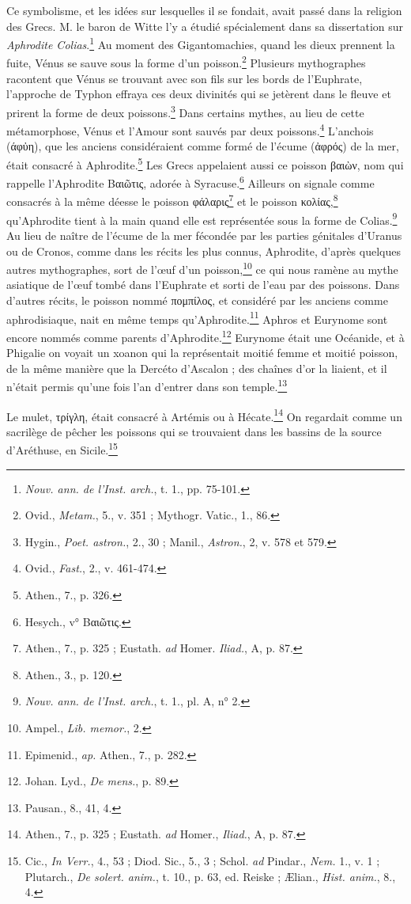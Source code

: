 \documentclass[a4paper, 11pt, oneside, landscape]{article}
\begin{document}
Ce symbolisme, et les idées sur lesquelles il se fondait, avait passé dans la religion des Grecs. M. le baron de Witte l'y a étudié spécialement dans sa dissertation sur \emph{Aphrodite Colias}.\footnote{\emph{Nouv. ann. de l'Inst. arch.}, t. 1., pp. 75-101.} Au moment des Gigantomachies, quand les dieux prennent la fuite, Vénus se sauve sous la forme d'un poisson.\footnote{Ovid., \emph{Metam.}, 5., v. 351 ; Mythogr. Vatic., 1., 86.} Plusieurs mythographes racontent que Vénus se trouvant avec son fils sur les bords de l'Euphrate, l'approche de Typhon effraya ces deux divinités qui se jetèrent dans le fleuve et prirent la forme de deux poissons.\footnote{Hygin., \emph{Poet. astron.}, 2., 30 ; Manil., \emph{Astron.}, 2, v. 578 et 579.} Dans certains mythes, au lieu de cette métamorphose, Vénus et l'Amour sont sauvés par deux poissons.\footnote{Ovid., \emph{Fast.}, 2., v. 461-474.} L'anchois (άφὐη), que les anciens considéraient comme formé de l'écume (ἀφρός) de la mer, était consacré à Aphrodite.\footnote{Athen., 7., p. 326.} Les Grecs appelaient aussi ce poisson βαιὼν, nom qui rappelle l'Aphrodite Βαιῶτις, adorée à Syracuse.\footnote{Hesych., v° Βαιῶτις.} Ailleurs on signale comme consacrés à la même déesse le poisson φάλαρις\footnote{Athen., 7., p. 325 ; Eustath. \emph{ad} Homer. \emph{Iliad.}, A, p. 87.} et le poisson κολίας,\footnote{Athen., 3., p. 120.} qu'Aphrodite tient à la main quand elle est représentée sous la forme de Colias.\footnote{\emph{Nouv. ann. de l'Inst. arch.}, t. 1., pl. A, n° 2.} Au lieu de naître de l'écume de la mer fécondée par les parties génitales d'Uranus ou de Cronos, comme dans les récits les plus connus, Aphrodite, d'après quelques autres mythographes, sort de l'œuf d'un poisson,\footnote{Ampel., \emph{Lib. memor.}, 2.} ce qui nous ramène au mythe asiatique de l'œuf tombé dans l'Euphrate et sorti de l'eau par des poissons. Dans d'autres récits, le poisson nommé πομπίλος, et considéré par les anciens comme aphrodisiaque, nait en même temps qu'Aphrodite.\footnote{Epimenid., \emph{ap.} Athen., 7., p. 282.} Aphros et Eurynome sont encore nommés comme parents d'Aphrodite.\footnote{Johan. Lyd., \emph{De mens.}, p. 89.} Eurynome était une Océanide, et à Phigalie on voyait un xoanon qui la représentait moitié femme et moitié poisson, de la même manière que la Dercéto d'Ascalon ; des chaînes d'or la liaient, et il n'était permis qu'une fois l'an d'entrer dans son temple.\footnote{Pausan., 8., 41, 4.}

Le mulet, τρίγλη, était consacré à Artémis ou à Hécate.\footnote{Athen., 7., p. 325 ; Eustath. \emph{ad} Homer., \emph{Iliad.}, A, p. 87.} On regardait comme un sacrilège de pêcher les poissons qui se trouvaient dans les bassins de la source d'Aréthuse, en Sicile.\footnote{Cic., \emph{In Verr.}, 4., 53 ; Diod. Sic., 5., 3 ; Schol. \emph{ad} Pindar., \emph{Nem.} 1., v. 1 ; Plutarch., \emph{De solert. anim.}, t. 10., p. 63, ed. Reiske ; Ælian., \emph{Hist. anim.}, 8., 4.}
\end{document}
